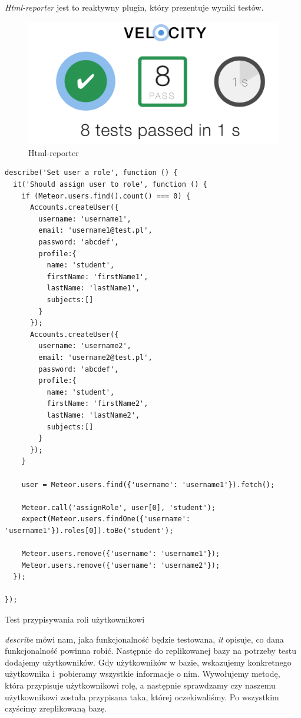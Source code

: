 \documentclass[openright]{xmgr}
\begin{document}
\noindent \textit{Html-reporter} jest to reaktywny plugin, który prezentuje wyniki testów.

\begin{figure}[H]
\centering
\includegraphics[width=0.4\hsize]{images/htmlReporter}
\caption{Html-reporter\label{RYS.18}}
\end{figure}

\begin{listing}[H]
\begin{verbatim}
describe('Set user a role', function () {
  it('Should assign user to role', function () {
    if (Meteor.users.find().count() === 0) {
      Accounts.createUser({
        username: 'username1',
        email: 'username1@test.pl',
        password: 'abcdef',
        profile:{
          name: 'student',
          firstName: 'firstName1',
          lastName: 'lastName1',
          subjects:[]
        }
      });
      Accounts.createUser({
        username: 'username2',
        email: 'username2@test.pl',
        password: 'abcdef',
        profile:{
          name: 'student',
          firstName: 'firstName2',
          lastName: 'lastName2',
          subjects:[]
        }
      });
    }

    user = Meteor.users.find({'username': 'username1'}).fetch();

    Meteor.call('assignRole', user[0], 'student');
    expect(Meteor.users.findOne({'username': 'username1'}).roles[0]).toBe('student');

    Meteor.users.remove({'username': 'username1'});
    Meteor.users.remove({'username': 'username2'});
  });

});
\end{verbatim}
\caption{Test przypisywania roli użytkownikowi}
\end{listing}

\textit{describe} mówi nam, jaka funkcjonalność będzie testowana, \textit{it} opisuje, co dana funkcjonalność powinna robić. Następnie do replikowanej bazy na potrzeby testu dodajemy użytkowników. Gdy użytkowników w bazie, wskazujemy konkretnego użytkownika i~pobieramy wszystkie informacje o nim. Wywołujemy metodę, która przypisuje użytkownikowi rolę, a następnie sprawdzamy czy naszemu użytkownikowi została przypisana taka, której oczekiwaliśmy. Po wszystkim czyścimy zreplikowaną bazę. \cite{Velocity}
\end{document}
